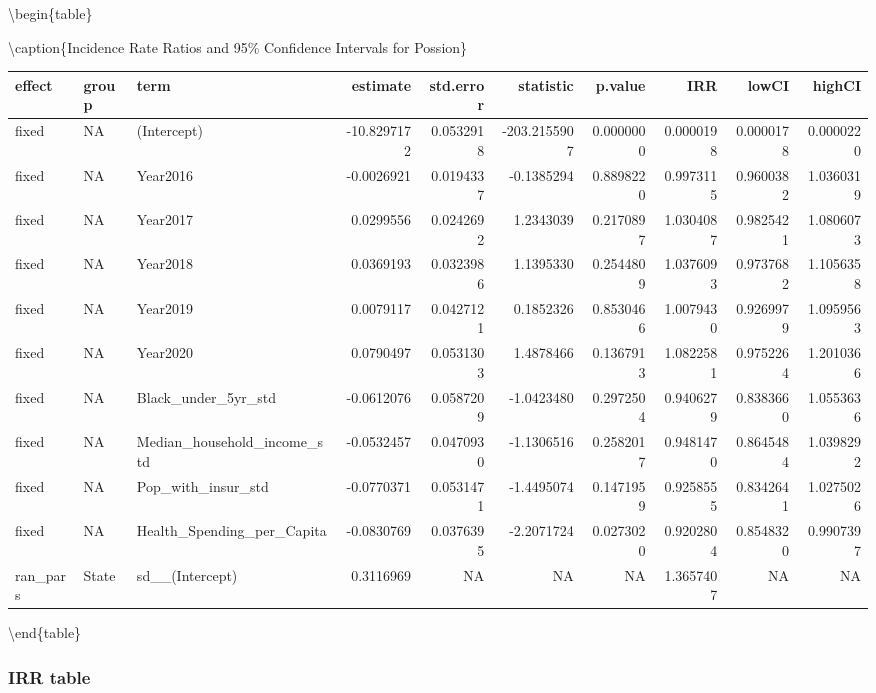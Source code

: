 \documentclass[
]{article}
\begin{document}
\textbackslash begin\{table\}

\textbackslash caption\{\label{tab:unnamed-chunk-11}Incidence Rate
Ratios and 95\% Confidence Intervals for Possion\} \centering

\begin{tabular}[t]{l|l|l|r|r|r|r|r|r|r}
\hline
effect & group & term & estimate & std.error & statistic & p.value & IRR & lowCI & highCI\\
\hline
fixed & NA & (Intercept) & -10.8297172 & 0.0532918 & -203.2155907 & 0.0000000 & 0.0000198 & 0.0000178 & 0.0000220\\
\hline
fixed & NA & Year2016 & -0.0026921 & 0.0194337 & -0.1385294 & 0.8898220 & 0.9973115 & 0.9600382 & 1.0360319\\
\hline
fixed & NA & Year2017 & 0.0299556 & 0.0242692 & 1.2343039 & 0.2170897 & 1.0304087 & 0.9825421 & 1.0806073\\
\hline
fixed & NA & Year2018 & 0.0369193 & 0.0323986 & 1.1395330 & 0.2544809 & 1.0376093 & 0.9737682 & 1.1056358\\
\hline
fixed & NA & Year2019 & 0.0079117 & 0.0427121 & 0.1852326 & 0.8530466 & 1.0079430 & 0.9269979 & 1.0959563\\
\hline
fixed & NA & Year2020 & 0.0790497 & 0.0531303 & 1.4878466 & 0.1367913 & 1.0822581 & 0.9752264 & 1.2010366\\
\hline
fixed & NA & Black\_under\_5yr\_std & -0.0612076 & 0.0587209 & -1.0423480 & 0.2972504 & 0.9406279 & 0.8383660 & 1.0553636\\
\hline
fixed & NA & Median\_household\_income\_std & -0.0532457 & 0.0470930 & -1.1306516 & 0.2582017 & 0.9481470 & 0.8645484 & 1.0398292\\
\hline
fixed & NA & Pop\_with\_insur\_std & -0.0770371 & 0.0531471 & -1.4495074 & 0.1471959 & 0.9258555 & 0.8342641 & 1.0275026\\
\hline
fixed & NA & Health\_Spending\_per\_Capita & -0.0830769 & 0.0376395 & -2.2071724 & 0.0273020 & 0.9202804 & 0.8548320 & 0.9907397\\
\hline
ran\_pars & State & sd\_\_(Intercept) & 0.3116969 & NA & NA & NA & 1.3657407 & NA & NA\\
\hline
\end{tabular}

\textbackslash end\{table\}

\hypertarget{irr-table}{%
\subsubsection{IRR table}\label{irr-table}}
\end{document}
